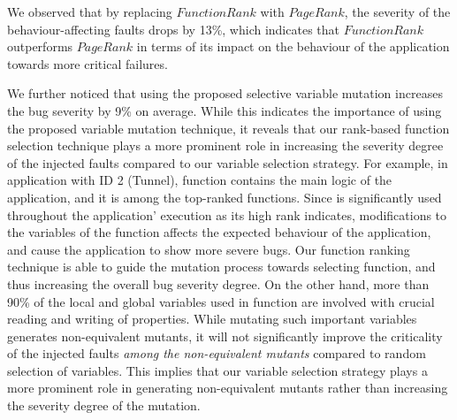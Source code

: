 We observed that by replacing $FunctionRank$ with $PageRank$, the severity of the behaviour-affecting faults drops by 13\%, which indicates that $FunctionRank$ outperforms $PageRank$ in terms of its impact on the behaviour of the application towards more critical failures.
%

We further noticed that using the proposed selective variable mutation increases the bug severity by 9\% on average. While this indicates the importance of
using the proposed variable mutation technique, it reveals that our rank-based function selection technique plays a more prominent role in increasing the severity degree of the injected faults compared to our variable selection strategy.
For example, in application with ID 2 (Tunnel), function  contains the main logic of the application, and it is among the top-ranked functions.
Since  is significantly used throughout the application' execution as its high rank indicates, modifications to the variables of the function affects the expected behaviour of the application, and cause the application to show more severe bugs. Our function ranking technique is able to guide the mutation process towards selecting  function, and thus increasing the overall bug severity degree. 
On the other hand, more than 90\% of the local and global variables used in function  are involved with crucial reading and writing of properties. While mutating such important variables generates non-equivalent mutants, it will not significantly improve the criticality of the injected faults \emph{among the non-equivalent mutants} compared to random selection of variables. This implies that
our variable selection strategy plays a more prominent role in generating non-equivalent mutants rather than increasing the severity degree of the mutation.       
       


